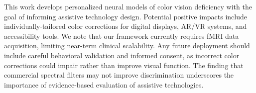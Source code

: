 \documentclass{article}
\begin{document}
This work develops personalized neural models of color vision deficiency with the goal of informing assistive technology design.
Potential positive impacts include individually-tailored color corrections for digital displays, AR/VR systems, and accessibility tools.
We note that our framework currently requires fMRI data acquisition, limiting near-term clinical scalability.
Any future deployment should include careful behavioral validation and informed consent, as incorrect color corrections could impair rather than improve visual function.
The finding that commercial spectral filters may not improve discrimination underscores the importance of evidence-based evaluation of assistive technologies.




\end{document}
